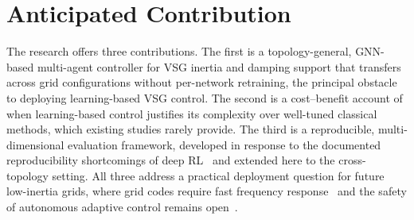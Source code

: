 \documentclass[11pt,a4paper]{article}
\begin{document}
\section{Anticipated Contribution}

The research offers three contributions. The first is a
topology-general, GNN-based multi-agent controller for VSG inertia and
damping support that transfers across grid configurations without
per-network retraining, the principal obstacle to deploying
learning-based VSG control. The second is a cost--benefit account of
when learning-based control justifies its complexity over well-tuned
classical methods, which existing studies rarely provide. The third is
a reproducible, multi-dimensional evaluation framework, developed in
response to the documented reproducibility shortcomings of deep
RL~\cite{henderson2018deepreinforcement,agarwal2021precipice} and extended
here to the cross-topology setting. All three address a practical
deployment question for future low-inertia grids, where grid codes
require fast frequency response~\cite{entsoe_rfg} and the safety of
autonomous adaptive control remains open~\cite{garcia2015safe}.



\end{document}
